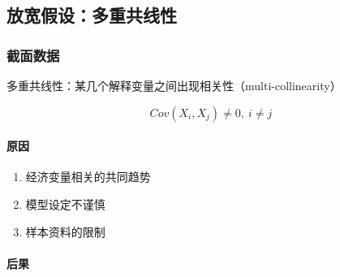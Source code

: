 \documentclass[12pt]{book}
\begin{document}
\subsection{放宽假设：多重共线性}



\subsubsection{截面数据}




多重共线性：某几个解释变量之间出现相关性（multi-collinearity）

$$
Cov\left(X_i,X_j\right)\neq0,\ i\neq j 
$$

\paragraph{原因}

\begin{enumerate}[1.]
    \item 经济变量相关的共同趋势  
    \item 模型设定不谨慎  
    \item 样本资料的限制
\end{enumerate}


\paragraph{后果}
\end{document}
